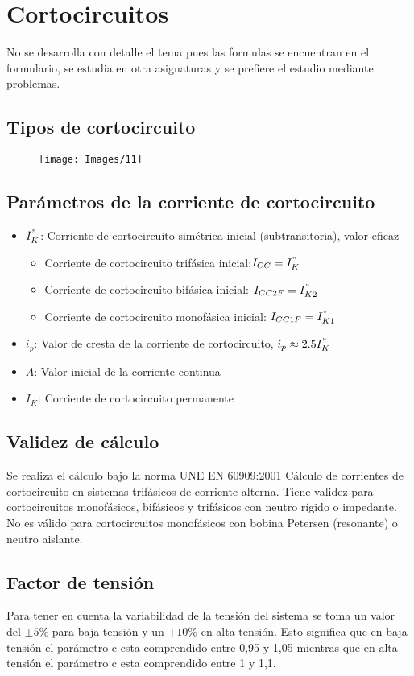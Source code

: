 \chapter{Cortocircuitos}
No se desarrolla con detalle el tema pues las formulas se encuentran en el formulario, se estudia en otra asignaturas y se prefiere el estudio mediante problemas.
\section{Tipos de cortocircuito}
\begin{figure}[H]
	\centering
	\texttt{[image: Images/11]}
	\label{fig:11}
\end{figure}
\section{Parámetros de la corriente de cortocircuito}
\begin{itemize}
	\item $I_K^"$: Corriente de cortocircuito simétrica inicial (subtransitoria), valor eficaz
	\begin{itemize}
		\item Corriente de cortocircuito trifásica inicial:$I_{CC}=I_{K}^"$
		\item Corriente de cortocircuito bifásica inicial: $I_{CC2F}=I_{K2}^"$
		\item Corriente de cortocircuito monofásica inicial: $I_{CC1F}=I_{K1}^"$
	\end{itemize}
	\item $i_p$: Valor de cresta de la corriente de cortocircuito, $i_p\approx 2.5 I_K^"$
	\item $A$: Valor inicial de la corriente continua
	\item $I_K$: Corriente de cortocircuito permanente
\end{itemize}
\section{Validez de cálculo}
Se realiza el cálculo bajo la norma UNE EN 60909:2001 Cálculo de corrientes de cortocircuito en sistemas trifásicos de corriente alterna. Tiene validez para cortocircuitos monofásicos, bifásicos y trifásicos con neutro rígido o impedante. No es válido para cortocircuitos monofásicos con bobina Petersen (resonante) o neutro aislante.
\section{Factor de tensión}
Para tener en cuenta la variabilidad de la tensión del sistema se toma un valor del $\pm5\%$ para baja tensión y un $+10\%$ en alta tensión. Esto significa que en baja tensión el parámetro c esta comprendido entre 0,95 y 1,05 mientras que en alta tensión el parámetro c esta comprendido entre 1 y 1,1.
